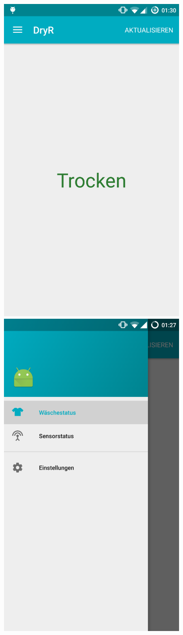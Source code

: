 \begin{description}
	\includegraphics[width=0.7\textwidth]{laundry_status_dry.png}
	\includegraphics[width=0.7\textwidth]{nav_drawer.png}


\end{description}
